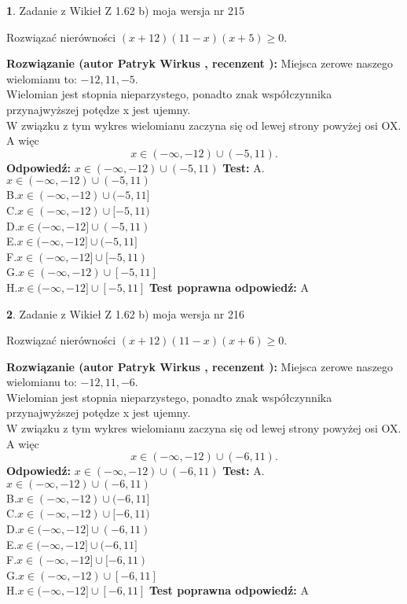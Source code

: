 \documentclass[12pt, a4paper]{article}
\theoremstyle{definition} %
\newtheorem{zad}{}
\newcommand{\zadStart}[1]{\begin{zad}#1\newline}
\newcommand{\zadStop}{\end{zad}}
\newcommand{\rozwStart}[2]{\noindent \textbf{Rozwiązanie (autor #1 , recenzent #2): }\newline}
\newcommand{\rozwStop}{\newline}
\newcommand{\odpStart}{\noindent \textbf{Odpowiedź:}\newline}
\newcommand{\odpStop}{\newline}
\newcommand{\testStart}{\noindent \textbf{Test:}\newline}
\newcommand{\testStop}{\newline}
\newcommand{\kluczStart}{\noindent \textbf{Test poprawna odpowiedź:}\newline}
\newcommand{\kluczStop}{\newline}
\begin{document}
\zadStart{Zadanie z Wikieł Z 1.62 b) moja wersja nr 215}

Rozwiązać nierówności $(x+12)(11-x)(x+5)\ge0$.
\zadStop
\rozwStart{Patryk Wirkus}{}
Miejsca zerowe naszego wielomianu to: $-12, 11, -5$.\\
Wielomian jest stopnia nieparzystego, ponadto znak współczynnika przy\linebreak najwyższej potędze x jest ujemny.\\ W związku z tym wykres wielomianu zaczyna się od lewej strony powyżej osi OX. A więc $$x \in (-\infty,-12) \cup (-5,11).$$
\rozwStop
\odpStart
$x \in (-\infty,-12) \cup (-5,11)$
\odpStop
\testStart
A.$x \in (-\infty,-12) \cup (-5,11)$\\
B.$x \in (-\infty,-12) \cup (-5,11]$\\
C.$x \in (-\infty,-12) \cup [-5,11)$\\
D.$x \in (-\infty,-12] \cup (-5,11)$\\
E.$x \in (-\infty,-12] \cup (-5,11]$\\
F.$x \in (-\infty,-12] \cup [-5,11)$\\
G.$x \in (-\infty,-12) \cup [-5,11]$\\
H.$x \in (-\infty,-12] \cup [-5,11]$
\testStop
\kluczStart
A
\kluczStop



\zadStart{Zadanie z Wikieł Z 1.62 b) moja wersja nr 216}

Rozwiązać nierówności $(x+12)(11-x)(x+6)\ge0$.
\zadStop
\rozwStart{Patryk Wirkus}{}
Miejsca zerowe naszego wielomianu to: $-12, 11, -6$.\\
Wielomian jest stopnia nieparzystego, ponadto znak współczynnika przy\linebreak najwyższej potędze x jest ujemny.\\ W związku z tym wykres wielomianu zaczyna się od lewej strony powyżej osi OX. A więc $$x \in (-\infty,-12) \cup (-6,11).$$
\rozwStop
\odpStart
$x \in (-\infty,-12) \cup (-6,11)$
\odpStop
\testStart
A.$x \in (-\infty,-12) \cup (-6,11)$\\
B.$x \in (-\infty,-12) \cup (-6,11]$\\
C.$x \in (-\infty,-12) \cup [-6,11)$\\
D.$x \in (-\infty,-12] \cup (-6,11)$\\
E.$x \in (-\infty,-12] \cup (-6,11]$\\
F.$x \in (-\infty,-12] \cup [-6,11)$\\
G.$x \in (-\infty,-12) \cup [-6,11]$\\
H.$x \in (-\infty,-12] \cup [-6,11]$
\testStop
\kluczStart
A
\kluczStop
\end{document}
